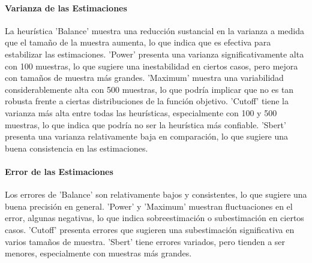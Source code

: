 \documentclass{article}
\begin{document}
\begin{table}[H]
\centering
\label{table:heuristic_analysis}
\caption{Análisis de los resultados por heurística}
\end{table}

\paragraph{Varianza de las Estimaciones}
La heurística 'Balance' muestra una reducción sustancial en la varianza a medida que el tamaño de la muestra aumenta, lo que indica que es efectiva para estabilizar las estimaciones.
'Power' presenta una varianza significativamente alta con 100 muestras, lo que sugiere una inestabilidad en ciertos casos, pero mejora con tamaños de muestra más grandes.
'Maximum' muestra una variabilidad considerablemente alta con 500 muestras, lo que podría implicar que no es tan robusta frente a ciertas distribuciones de la función objetivo.
'Cutoff' tiene la varianza más alta entre todas las heurísticas, especialmente con 100 y 500 muestras, lo que indica que podría no ser la heurística más confiable.
'Sbert' presenta una varianza relativamente baja en comparación, lo que sugiere una buena consistencia en las estimaciones.

\paragraph{Error de las Estimaciones}
Los errores de 'Balance' son relativamente bajos y consistentes, lo que sugiere una buena precisión en general.
'Power' y 'Maximum' muestran fluctuaciones en el error, algunas negativas, lo que indica sobreestimación o subestimación en ciertos casos.
'Cutoff' presenta errores que sugieren una subestimación significativa en varios tamaños de muestra.
'Sbert' tiene errores variados, pero tienden a ser menores, especialmente con muestras más grandes.
\end{document}
